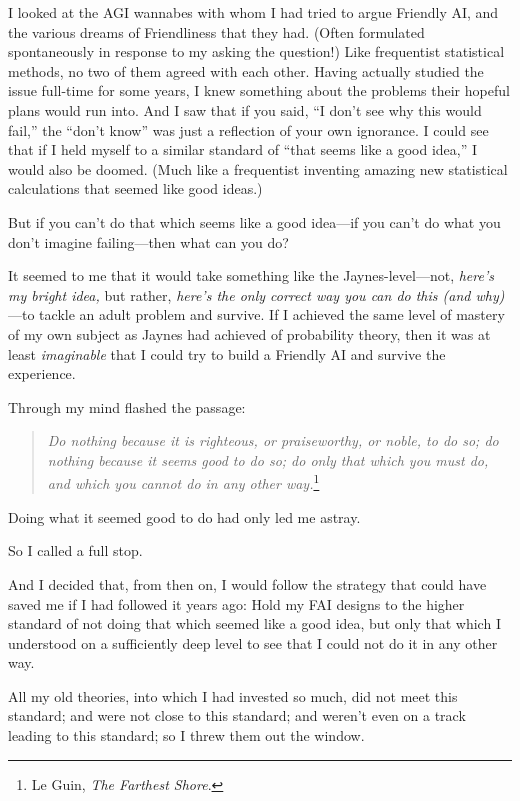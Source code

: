 {
 I looked at the AGI wannabes with whom I had tried to argue
Friendly AI, and the various dreams of Friendliness that they had.
(Often formulated spontaneously in response to my asking the question!)
Like frequentist statistical methods, no two of them agreed with each
other. Having actually studied the issue full-time for some years, I
knew something about the problems their hopeful plans would run into.
And I saw that if you said, ``I don't
see why this would fail,'' the
``don't know'' was
just a reflection of your own ignorance. I could see that if I held
myself to a similar standard of ``that seems like a
good idea,'' I would also be doomed. (Much like a
frequentist inventing amazing new statistical calculations that seemed
like good ideas.)}

{
 But if you can't do that which seems like a good
idea---if you can't do what you don't
imagine failing---then what can you do?}

{
 It seemed to me that it would take something like the
Jaynes-level---not, \textit{here's my bright idea,} but
rather, \textit{here's the only correct way you can do
this (and why)}{}---to tackle an adult problem and survive. If I
achieved the same level of mastery of my own subject as Jaynes had
achieved of probability theory, then it was at least
\textit{imaginable} that I could try to build a Friendly AI and survive
the experience.}

{
 Through my mind flashed the passage:}

\begin{quote}
{
 \textit{Do nothing because it is righteous, or praiseworthy, or
noble, to do so; do nothing because it seems good to do so; do only
that which you must do, and which you cannot do in any other
way.}\footnote{Le Guin, \textit{The Farthest Shore}.}}
\end{quote}

{
 Doing what it seemed good to do had only led me astray.}

{
 So I called a full stop.}

{
 And I decided that, from then on, I would follow the strategy that
could have saved me if I had followed it years ago: Hold my FAI designs
to the higher standard of not doing that which seemed like a good idea,
but only that which I understood on a sufficiently deep level to see
that I could not do it in any other way.}

{
 All my old theories, into which I had invested so much, did not
meet this standard; and were not close to this standard; and
weren't even on a track leading to this standard; so I
threw them out the window.}

